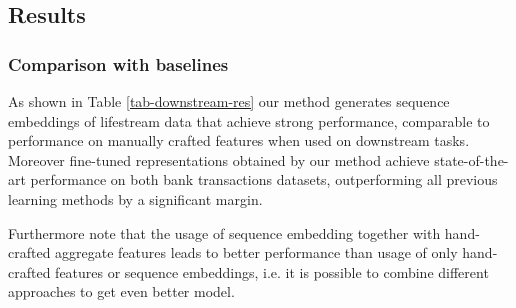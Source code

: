 \documentclass{article}
\begin{document}



\subsection{Results} \label{sec-res}

\subsubsection{Comparison with baselines} \label{sec-res-baselines}

As shown in Table \ref{tab-downstream-res} our method generates sequence embeddings of lifestream data that achieve strong performance, comparable to performance on manually crafted features when used on downstream tasks. Moreover fine-tuned representations obtained by our method achieve state-of-the-art performance on both bank transactions datasets, outperforming all previous learning methods by a significant margin.

Furthermore note that the usage of sequence embedding together with hand-crafted aggregate features leads to better performance than usage of only hand-crafted features or sequence embeddings, i.e. it is possible to combine different approaches to get even better model.
\end{document}
